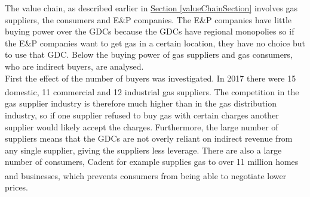 \documentclass[11pt]{article}		%
\newcommand{\supercite}[1]{\textsuperscript{\cite{#1}}}		%
\newcommand{\sectref}[1]{\hyperref[#1]{Section \ref*{#1}}}     %
\begin{document}
		        The value chain, as described earlier in \sectref{valueChainSection} involves gas suppliers, the consumers and E\&P companies. The E\&P companies have little buying power over the GDCs because the GDCs have regional monopolies so if the E\&P companies want to get gas in a certain location, they have no choice but to use that GDC. Below the buying power of gas suppliers and gas consumers, who are indirect buyers, are analysed. %
                \\
                \hspace*{2ex}
                First the effect of the number of buyers was investigated. In 2017 there were 15 domestic, 11 commercial and 12 industrial gas suppliers\supercite{competition_in_gas_supply}. The competition in the gas supplier industry is therefore much higher than in the gas distribution industry, so if one supplier refused to buy gas with certain charges another supplier would likely accept the charges. Furthermore, the large number of suppliers means that the GDCs are not overly reliant on indirect revenue from any single supplier, giving the suppliers less leverage. There are also a large number of consumers, Cadent for example supplies gas to over 11 million homes and businesses\supercite{Cadent_Plan}, which prevents consumers from being able to negotiate lower prices.
                \\
\end{document}
